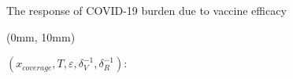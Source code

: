 \begin{frame}{The response of COVID-19 burden due to vaccine efficacy}
    \begin{textblock*}{127mm}(0mm, 10mm) 
        \begin{block}{%
            $
                (x_{coverage},
                T, \varepsilon,\delta_{V}^{-1}, \delta_{R}^{-1}):
            $%
        }
        \end{block}
    \end{textblock*}
\end{frame}